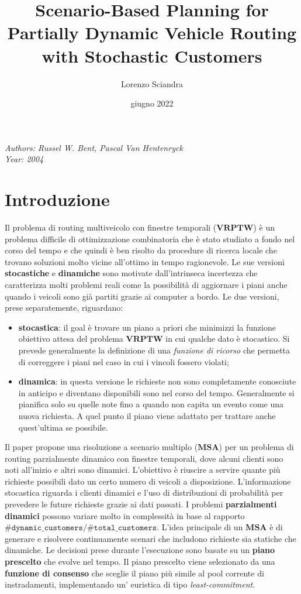 \documentclass[
]{article}
\title{Scenario-Based Planning for Partially Dynamic Vehicle Routing
with Stochastic Customers}
\author{Lorenzo Sciandra}
\date{giugno 2022}
\providecommand{\tightlist}{%
  \setlength{\itemsep}{0pt}\setlength{\parskip}{0pt}}
\begin{document}
\maketitle

\emph{Authors: Russel W. Bent, Pascal Van Hentenryck}\\
\emph{Year: 2004}

\hypertarget{introduzione}{%
\section{Introduzione}\label{introduzione}}

Il problema di routing multiveicolo con finestre temporali
({\(\mathbf{VRPTW}\)}) è un problema difficile di ottimizzazione
combinatoria che è stato studiato a fondo nel corso del tempo e che
quindi è ben risolto da procedure di ricerca locale che trovano
soluzioni molto vicine all'ottimo in tempo ragionevole. Le sue versioni
\textbf{stocastiche} e \textbf{dinamiche} sono motivate dall'intrinseca
incertezza che caratterizza molti problemi reali come la possibilità di
aggiornare i piani anche quando i veicoli sono già partiti grazie ai
computer a bordo. Le due versioni, prese separatemente, riguardano:

\begin{itemize}
\tightlist
\item
  \textbf{stocastica}: il goal è trovare un piano a priori che minimizzi
  la funzione obiettivo attesa del problema {\(\mathbf{VRPTW}\)} in cui
  qualche dato è stocastico. Si prevede generalmente la definizione di
  una \emph{funzione di ricorso} che permetta di correggere i piani nel
  caso in cui i vincoli fossero violati;
\item
  \textbf{dinamica}: in questa versione le richieste non sono
  completamente conosciute in anticipo e diventano disponibili sono nel
  corso del tempo. Generalmente si pianifica solo su quelle note fino a
  quando non capita un evento come una nuova richiesta. A quel punto il
  piano viene adattato per trattare anche quest'ultima se possibile.
\end{itemize}

Il paper propone una risoluzione a scenario multiplo
({\(\mathbf{MSA}\)}) per un problema di routing parzialmente dinamico
con finestre temporali, dove alcuni clienti sono noti all'inizio e altri
sono dinamici. L'obiettivo è riuscire a servire quante più richieste
possibili dato un certo numero di veicoli a disposizione. L'informazione
stocastica riguarda i clienti dinamici e l'uso di distribuzioni di
probabilità per prevedere le future richieste grazie ai dati passati. I
problemi \textbf{parzialmenti dinamici} possono variare molto in
complessità in base al rapporto
{\(\texttt{\#dynamic\_customers/\#total\_customers}\)}. L'idea principale di
un {\(\mathbf{MSA}\)} è di generare e risolvere continuamente scenari
che includono richieste sia statiche che dinamiche. Le decisioni prese
durante l'esecuzione sono basate su un \textbf{piano prescelto} che
evolve nel tempo. Il piano prescelto viene selezionato da una
\textbf{funzione di consenso} che sceglie il piano più simile al pool
corrente di instradamenti, implementando un' euristica di tipo
\emph{least-commitment}.
\end{document}
